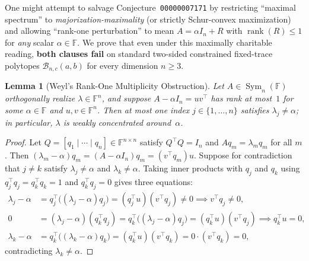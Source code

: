 \documentclass[11pt]{article}
\newtheorem{lemma}[theorem]{Lemma}
\theoremstyle{definition}
\theoremstyle{remark}
\newcommand{\rk}{\operatorname{rank}}
\newcommand{\Sym}{\operatorname{Sym}}
\begin{document}
One might attempt to salvage Conjecture~\texttt{00000007171} by restricting ``maximal spectrum'' to \emph{majorization-maximality} (or strictly Schur-convex maximization) and allowing ``rank-one perturbation'' to mean $A = \alpha I_n + R$ with $\rk(R) \le 1$ for \emph{any} scalar $\alpha \in \mathbb{F}$. We prove that even under this maximally charitable reading, \textbf{both clauses fail} on standard two-sided constrained fixed-trace polytopes $\mathcal{B}_{n,c}(a,b)$ for every dimension $n \ge 3$.

\begin{lemma}[Weyl's Rank-One Multiplicity Obstruction]
\label{lem:weyl-rank1}
Let $A \in \Sym_n(\mathbb{F})$ orthogonally realize $\lambda \in \mathbb{F}^n$, and suppose $A - \alpha I_n = u v^\top$ has rank at most~$1$ for some $\alpha \in \mathbb{F}$ and $u, v \in \mathbb{F}^n$. Then at most one index $j \in \{1, \dots, n\}$ satisfies $\lambda_j \neq \alpha$; in particular, $\lambda$ is weakly concentrated around~$\alpha$.
\end{lemma}

\begin{proof}
Let $Q = [q_1 \mid \cdots \mid q_n] \in \mathbb{F}^{n \times n}$ satisfy $Q^\top Q = I_n$ and $A q_m = \lambda_m q_m$ for all $m$. Then $(\lambda_m - \alpha) q_m = (A - \alpha I_n) q_m = (v^\top q_m) u$. Suppose for contradiction that $j \neq k$ satisfy $\lambda_j \neq \alpha$ and $\lambda_k \neq \alpha$. Taking inner products with $q_j$ and $q_k$ using $q_j^\top q_j = q_k^\top q_k = 1$ and $q_k^\top q_j = 0$ gives three equations:
\begin{align*}
  \lambda_j - \alpha &= q_j^\top \bigl((\lambda_j - \alpha) q_j\bigr) = (q_j^\top u)(v^\top q_j) \neq 0 \implies v^\top q_j \neq 0,\\
  0 &= (\lambda_j - \alpha)(q_k^\top q_j) = q_k^\top \bigl((\lambda_j - \alpha) q_j\bigr) = (q_k^\top u)(v^\top q_j) \implies q_k^\top u = 0,\\
  \lambda_k - \alpha &= q_k^\top \bigl((\lambda_k - \alpha) q_k\bigr) = (q_k^\top u)(v^\top q_k) = 0 \cdot (v^\top q_k) = 0,
\end{align*}
contradicting $\lambda_k \neq \alpha$.
\end{proof}
\end{document}

